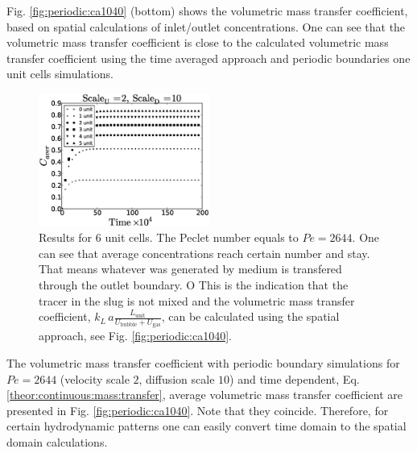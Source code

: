 \documentclass{article}
\newcommand{\vol}{k_L\,a}
\newcommand{\lunit}{L_{\mathrm{unit}}}
\newcommand{\ububble}{U_{\mathrm{bubble}}}
\newcommand{\ugas}{U_{\mathrm{gas}}}
\newcommand{\volnondim}{\vol \frac{\lunit}{\ububble+\ugas}}
\begin{document}
Fig. \ref{fig:periodic:ca1040}
(bottom) shows the volumetric mass transfer coefficient, based on spatial calculations of
inlet/outlet concentrations. One can see that the volumetric mass transfer coefficient is close to
the calculated volumetric mass transfer coefficient using the time averaged approach and periodic
boundaries one unit cells simulations. 
\begin{figure}[htb!]
\begin{center}
\includegraphics[width=0.5\textwidth]{Figures/aver_units6scaleu2scaled5.eps}
\end{center}
\caption{Results for $6$ unit cells. The Peclet number equals to $Pe=2644$.
One can see that average concentrations reach certain number and stay.
That means whatever was
generated by medium is transfered through the outlet
boundary. O This is the indication that the tracer in the slug is not
mixed and the volumetric mass transfer coefficient, $\volnondim$, can be
calculated using the spatial approach, see Fig.
\ref{fig:periodic:ca1040}.\label{fig:6:units:ca1040}}
\end{figure}
The volumetric mass transfer coefficient with periodic boundary simulations for $Pe=2644$ (velocity
scale $2$, diffusion scale $10$) and time dependent, Eq. \ref{theor:continuous:mass:transfer},
average volumetric mass transfer coefficient are presented in Fig. \ref{fig:periodic:ca1040}. Note
that they coincide. Therefore, for certain hydrodynamic patterns one can easily convert time
domain to the spatial domain calculations.
\end{document}
